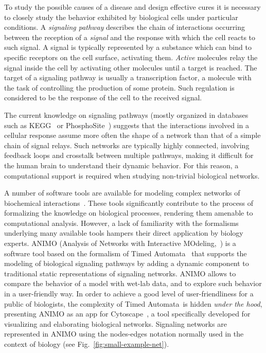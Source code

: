 \documentclass{llncs}
\newcommand{\tas}{Timed Automata}
\begin{document}
To study the possible causes of a disease and design effective cures it is 
necessary to closely study the behavior exhibited by biological cells under particular conditions.
A \emph{signaling pathway} describes the chain of interactions occurring
between the reception of a \emph{signal} and the response with which the cell
reacts to such signal. 
A signal is typically represented by a substance which can bind
to specific receptors on the cell surface, activating them.
\emph{Active} molecules relay the signal inside the cell by activating
other molecules until a target is reached. The target of a signaling pathway is usually a transcription
factor, a molecule with the task of controlling the production of some protein. Such regulation is considered to be the response of the cell to the received signal.

The current knowledge on signaling pathways (mostly organized in databases such as KEGG~\cite{kegg}
or PhosphoSite~\cite{phosphosite}) suggests that the interactions involved in a cellular response assume more often
the shape of a network than that of a simple chain of signal relays.
Such networks are typically highly connected, involving feedback loops and crosstalk
between multiple pathways, making it difficult for the human
brain to understand their dynamic behavior.
For this reason, a computational support is required when studying non-trivial biological networks.

A number of software tools are available
for modeling complex networks of biochemical interactions~\cite{bio-pepa,blenx,copasi,e-cell,gna}.
These tools significantly contribute to the process of formalizing the knowledge on biological
processes, rendering them amenable to computational analysis.
However, a lack of familiarity with the formalisms underlying many available tools
hampers their direct application by biology experts.
ANIMO (Analysis of Networks with Interactive MOdeling,~\cite{animo-site,animo-ieee,animo-gene}) is a software tool
based on the formalism of \tas~\cite{timed-automata-alur} that supports the
modeling of biological signaling pathways
by adding a dynamic component to traditional static representations of signaling networks.
ANIMO allows to compare the behavior of
a model with wet-lab data, and to explore such behavior in a user-friendly way.
In order to achieve a good level of user-friendliness for a public of biologists, the complexity of \tas\ is hidden \emph{under the hood},
presenting ANIMO as an app for Cytoscape~\cite{cytoscape}, a tool specifically developed for visualizing 
and elaborating biological networks. Signaling networks are represented in ANIMO using
the nodes-edges notation normally used in the context of biology (see Fig.~\ref{fig:small-example-net}).
\end{document}

